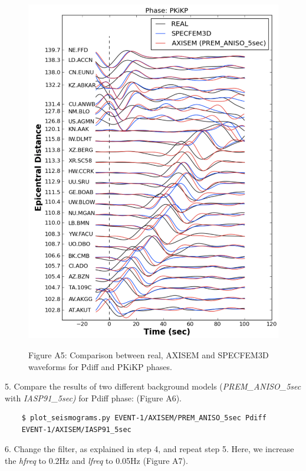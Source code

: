 \documentclass{article}
\begin{document}
\begin{figure}
\begin{minipage}{.5\textwidth}
  \includegraphics[width=1.\linewidth]{AXISEMTutorial-fig011.pdf}
\end{minipage}
\begin{center}
{\small{}Figure A5: Comparison between real, AXISEM and SPECFEM3D waveforms for 
Pdiff and PKiKP phases.}
\end{center}
\end{figure}

5. Compare the results of two different background models (\textit{PREM\_ANISO\_5sec} with 
\textit{IASP91\_5sec)} for Pdiff phase: (Figure A6).

\begin{verbatim}
    $ plot_seismograms.py EVENT-1/AXISEM/PREM_ANISO_5sec Pdiff 
    EVENT-1/AXISEM/IASP91_5sec
\end{verbatim}

6. Change the filter, as explained in step 4, and repeat step 5. Here, we increase 
the \textit{hfreq} to 0.2Hz and \textit{lfreq} to 0.05Hz (Figure A7).
\end{document}
